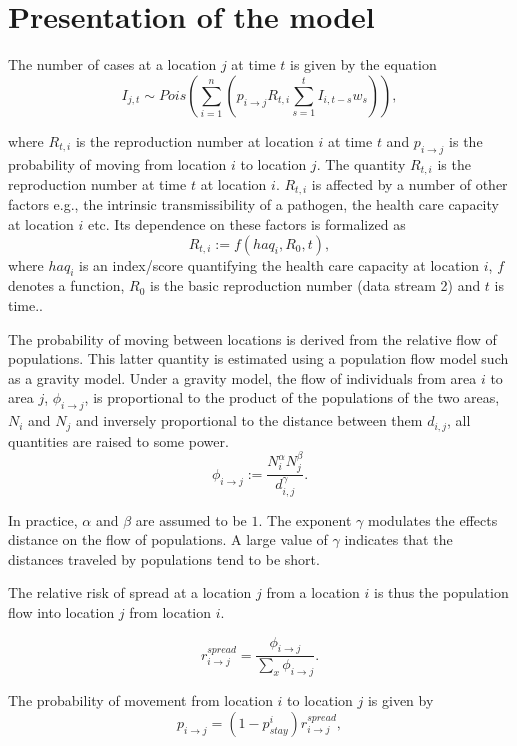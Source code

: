 \documentclass[11pt,]{article}
\begin{document}
\section{Presentation of the model}\label{sec:model}

The number of cases at a location \(j\) at time \(t\) is given by the equation
\[
  I_{j, t} \sim Pois\left( \sum_{i = 1}^{n} {\left( p_{i \rightarrow j}
  R_{t, i} \sum_{s = 1}^{t}{I_{i, t - s} w_{s}}\right)} \right),
\]

where \(R_{t, i}\) is the reproduction number at location \(i\) at time
\(t\) and \(p_{i \rightarrow j}\) is the probability of moving from
location \(i\) to location \(j\). The quantity $R_{t, i}$ is the
reproduction number at time $t$ at location $i$. $R_{t, i}$ is
affected by a number of other factors e.g., the intrinsic
transmissibility of a pathogen, the health care capacity at location
$i$ etc. Its dependence on these factors is formalized as
\[ R_{t, i} := f(haq_i, R_0, t),\]
where $haq_i$ is an index/score quantifying the health care capacity at location 
$i$, $f$ denotes a function, $R_0$ is the basic reproduction number (data stream 2) and $t$ is time..

The probability of moving between locations is derived from the
relative flow of populations.
This latter quantity is estimated using a population flow
model such as a gravity model. Under a gravity model, the flow of individuals from area \(i\) to area \(j\),
\(\phi_{i \rightarrow j}\), is proportional to the product of the
populations of the two areas, \(N_i\) and \(N_j\) and inversely
proportional to the distance between them \(d_{i, j}\), all quantities
are raised to some power.
\[
  \phi_{i \rightarrow j} :=  \frac{N_i^{\alpha}N_j^{\beta}}{d_{i, j}^{\gamma}}.
\]

In practice, \( \alpha \) and \( \beta \) are assumed to be $1$. The
exponent \( \gamma \) modulates the effects distance on the flow of
populations. A large value of \( \gamma \) indicates that the
distances traveled by populations tend to be short.

The relative risk of spread at a location \(j\) from a location \(i\)
is thus the population flow into location \(j\) from location \(i\).

\[
  r_{i \rightarrow j}^{spread} = \frac{\phi_{i \rightarrow
  j}}{\sum_{x}{\phi_{i \rightarrow
  j}}}.
\]

The probability of movement from location \(i\) to location \(j\) is given by
\[  p_{i \rightarrow j} = (1 - p_{stay}^i) r_{i \rightarrow j}^{spread},\]
\end{document}
